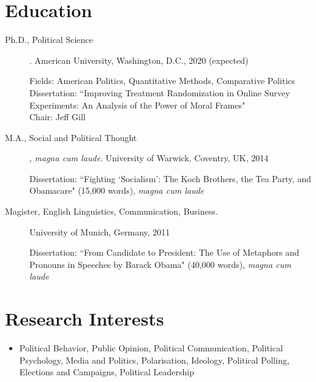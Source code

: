 \documentclass[10pt]{article}
\begin{document}
\begin{flushleft}


\vspace{0.1cm}

\section*{Education}

\begin{description}
\item[{\sc Ph.D.}, Political Science]\hspace{-0.175cm}. American University,
Washington, D.C., 2020 (expected) \par
Fields: American Politics, Quantitative Methods, Comparative Politics \\ 
Dissertation: ``Improving Treatment Randomization in Online Survey Experiments: An Analysis of the Power of Moral Frames"\\
Chair: Jeff Gill
\end{description}

\begin{description}
\item[{\sc M.A.}, Social and Political Thought]\hspace{-0.175cm}, \textit{magna cum laude}. University of Warwick, Coventry, UK, 2014 \par
Dissertation: ``Fighting `Socialism': The Koch Brothers, the Tea Party, and Obamacare" (15,000 words), \textit{magna cum laude} \\
\end{description}

\begin{description}
\item[{\sc Magister}, English Linguistics, Communication, Business.] University of Munich, Germany, 2011 \par
Dissertation: ``From Candidate to President: The Use of Metaphors and Pronouns in Speeches by Barack Obama" (40,000 words), \textit{magna cum laude} \\
\end{description}




\section*{Research Interests}

\begin{itemize}
\item[] Political Behavior, Public Opinion, Political Communication, Political Psychology, Media and Politics, Polarisation, Ideology, Political Polling, Elections and Campaigns, Political Leadership
\end{itemize}





\end{flushleft}
\end{document}
